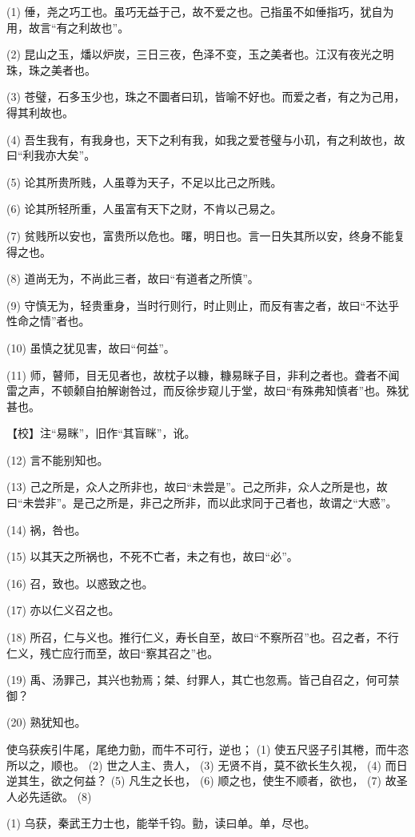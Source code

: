 \documentclass[12pt,UTF8]{ctexbook}
\begin{document}
(1) 倕，尧之巧工也。虽巧无益于己，故不爱之也。己指虽不如倕指巧，犹自为用，故言“有之利故也”。

(2) 昆山之玉，燔以炉炭，三日三夜，色泽不变，玉之美者也。江汉有夜光之明珠，珠之美者也。

(3) 苍璧，石多玉少也，珠之不圜者曰玑，皆喻不好也。而爱之者，有之为己用，得其利故也。

(4) 吾生我有，有我身也，天下之利有我，如我之爱苍璧与小玑，有之利故也，故曰“利我亦大矣”。

(5) 论其所贵所贱，人虽尊为天子，不足以比己之所贱。

(6) 论其所轻所重，人虽富有天下之财，不肯以己易之。

(7) 贫贱所以安也，富贵所以危也。曙，明日也。言一日失其所以安，终身不能复得之也。

(8) 道尚无为，不尚此三者，故曰“有道者之所慎”。

(9) 守慎无为，轻贵重身，当时行则行，时止则止，而反有害之者，故曰“不达乎性命之情”者也。

(10) 虽慎之犹见害，故曰“何益”。

(11) 师，瞽师，目无见者也，故枕子以糠，糠易眯子目，非利之者也。聋者不闻雷之声，不顿颡自拍解谢咎过，而反徐步窥儿于堂，故曰“有殊弗知慎者”也。殊犹甚也。

【校】注“易眯”，旧作“其盲眯”，讹。

(12) 言不能别知也。

(13) 己之所是，众人之所非也，故曰“未尝是”。己之所非，众人之所是也，故曰“未尝非”。是己之所是，非己之所非，而以此求同于己者也，故谓之“大惑”。

(14) 祸，咎也。

(15) 以其天之所祸也，不死不亡者，未之有也，故曰“必”。

(16) 召，致也。以惑致之也。

(17) 亦以仁义召之也。

(18) 所召，仁与义也。推行仁义，寿长自至，故曰“不察所召”也。召之者，不行仁义，残亡应行而至，故曰“察其召之”也。

(19) 禹、汤罪己，其兴也勃焉；桀、纣罪人，其亡也忽焉。皆己自召之，何可禁御？

(20) 熟犹知也。

使乌获疾引牛尾，尾绝力勯，而牛不可行，逆也； (1) 使五尺竖子引其棬，而牛恣所以之，顺也。 (2) 世之人主、贵人， (3) 无贤不肖，莫不欲长生久视， (4) 而日逆其生，欲之何益？ (5) 凡生之长也， (6) 顺之也，使生不顺者，欲也， (7) 故圣人必先适欲。 (8)

(1) 乌获，秦武王力士也，能举千钧。勯，读曰单。单，尽也。
\end{document}
